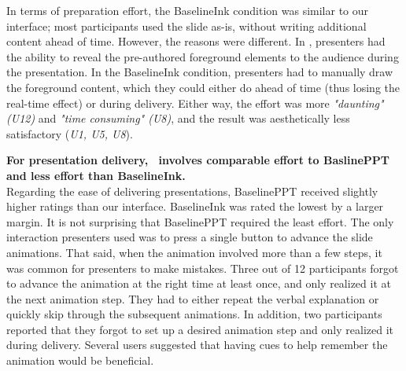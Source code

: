 %
In terms of preparation effort, the BaselineInk condition was similar to our interface; most participants used the slide as-is, without writing additional content ahead of time. However, the reasons were different. In \interface, presenters had the ability to reveal the pre-authored foreground elements to the audience during the presentation. In the BaselineInk condition, presenters had to manually draw the foreground content, which they could either do ahead of time (thus losing the real-time effect) or during delivery. Either way, the effort was more \textit{"daunting"  (U12)} and  \textit{"time consuming" (U8)}, and the result was aesthetically less satisfactory (\textit{U1, U5, U8}).  
%

\textbf{For presentation delivery, \interface\ involves comparable effort to BaslinePPT and less effort than BaselineInk.}\\
%
%
Regarding the ease of delivering presentations, BaselinePPT received slightly higher ratings than our interface. BaselineInk was rated the lowest by a larger margin. 
%
%
It is not surprising that BaselinePPT required the least effort. The only interaction presenters used was to press a single button to advance the slide animations. That said, when the animation involved more than a few steps, it was common for presenters to make mistakes. Three out of 12 participants forgot to advance the animation at the right time at least once, and only realized it at the next animation step. They had to either repeat the verbal explanation or quickly skip through the subsequent animations. In addition, two participants reported that they forgot to set up a desired animation step and only realized it during delivery. Several users suggested that having cues to help remember the animation would be beneficial.

